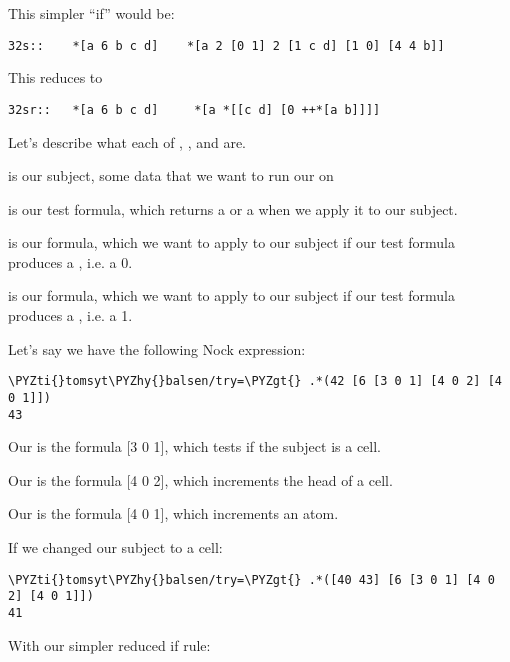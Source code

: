 This simpler ``if'' would be:

\begin{framed_shaded}
\begin{Verbatim}[fontsize=\relsize{-2.5},fontseries=b,commandchars=\\\{\}]
32s::    *[a 6 b c d]    *[a 2 [0 1] 2 [1 c d] [1 0] [4 4 b]]
\end{Verbatim}
\end{framed_shaded}
This reduces to

\begin{framed_shaded}
\begin{Verbatim}[fontsize=\relsize{-2.5},fontseries=b,commandchars=\\\{\}]
32sr::   *[a 6 b c d]     *[a *[[c d] [0 ++*[a b]]]]
\end{Verbatim}
\end{framed_shaded}
Let's describe what each of , ,  and  are.

 is our subject, some data that we want to run our  on

 is our test formula, which returns a  or a  when we apply it to our subject. 

 is our  formula, which we want to apply to our subject if our test formula produces a , i.e. a 0.

 is our  formula, which we want to apply to our subject if our test formula produces a , i.e. a 1.

Let's say we have the following Nock expression:

\begin{framed_shaded}
\begin{Verbatim}[fontsize=\relsize{-2.5},fontseries=b,commandchars=\\\{\}]
\PYZti{}tomsyt\PYZhy{}balsen/try=\PYZgt{} .*(42 [6 [3 0 1] [4 0 2] [4 0 1]])
43
\end{Verbatim}
\end{framed_shaded}
Our  is the formula [3 0 1], which tests if the subject is a cell.

Our  is the formula [4 0 2], which increments the head of a cell.

Our  is the formula [4 0 1], which increments an atom.

If we changed our subject to a cell:

\begin{framed_shaded}
\begin{Verbatim}[fontsize=\relsize{-2.5},fontseries=b,commandchars=\\\{\}]
\PYZti{}tomsyt\PYZhy{}balsen/try=\PYZgt{} .*([40 43] [6 [3 0 1] [4 0 2] [4 0 1]])
41
\end{Verbatim}
\end{framed_shaded}
With our simpler reduced if rule:

